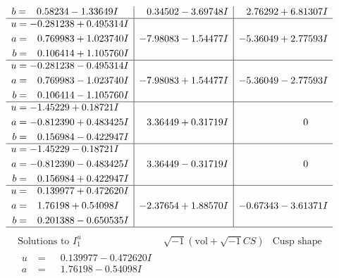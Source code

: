 \documentclass[1p]{elsarticle_modified}
\theoremstyle{definition}
\newcommand{\I}{\sqrt{-1}}
\begin{document}
$$\begin{array}{c|c|c}
\begin{aligned}
b &= \phantom{-}0.58234 - 1.33649 I\end{aligned}
 & \phantom{-}0.34502 - 3.69748 I & \phantom{-}2.76292 + 6.81307 I \\ \hline\begin{aligned}
u &= -0.281238 + 0.495314 I \\
a &= \phantom{-}0.769983 + 1.023740 I \\
b &= \phantom{-}0.106414 + 1.105760 I\end{aligned}
 & -7.98083 - 1.54477 I & -5.36049 + 2.77593 I \\ \hline\begin{aligned}
u &= -0.281238 - 0.495314 I \\
a &= \phantom{-}0.769983 - 1.023740 I \\
b &= \phantom{-}0.106414 - 1.105760 I\end{aligned}
 & -7.98083 + 1.54477 I & -5.36049 - 2.77593 I \\ \hline\begin{aligned}
u &= -1.45229 + 0.18721 I \\
a &= -0.812390 + 0.483425 I \\
b &= \phantom{-}0.156984 - 0.422947 I\end{aligned}
 & \phantom{-}3.36449 + 0.31719 I & \phantom{-0.000000 } 0 \\ \hline\begin{aligned}
u &= -1.45229 - 0.18721 I \\
a &= -0.812390 - 0.483425 I \\
b &= \phantom{-}0.156984 + 0.422947 I\end{aligned}
 & \phantom{-}3.36449 - 0.31719 I & \phantom{-0.000000 } 0 \\ \hline\begin{aligned}
u &= \phantom{-}0.139977 + 0.472620 I \\
a &= \phantom{-}1.76198 + 0.54098 I \\
b &= \phantom{-}0.201388 - 0.650535 I\end{aligned}
 & -2.37654 + 1.88570 I & -0.67343 - 3.61371 I\\
 \hline 
 \end{array}$$\newpage$$\begin{array}{c|c|c}  
\text{Solutions to }I^u_{1}& \I (\text{vol} + \sqrt{-1}CS) & \text{Cusp shape}\\
 \hline 
\begin{aligned}
u &= \phantom{-}0.139977 - 0.472620 I \\
a &= \phantom{-}1.76198 - 0.54098 I \\

\end{aligned}
\end{array}$$
\end{document}
